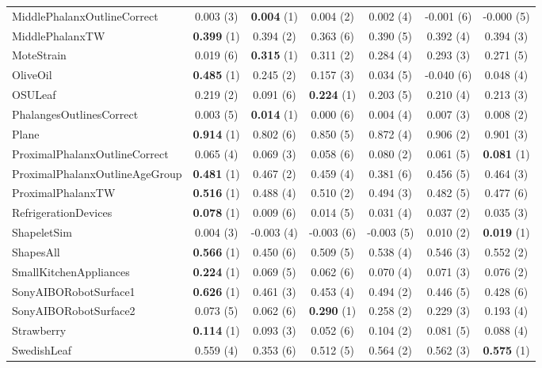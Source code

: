 \begin{table}[ht]
\begin{adjustbox}{width=\textwidth}
\begin{tabular}{lcccccc}
    MiddlePhalanxOutlineCorrect & 0.003 (3) & \textbf{0.004} (1) & 0.004 (2) & 0.002 (4) & -0.001 (6) & -0.000 (5) \\
    MiddlePhalanxTW & \textbf{0.399} (1) & 0.394 (2) & 0.363 (6) & 0.390 (5) & 0.392 (4) & 0.394 (3) \\
    MoteStrain & 0.019 (6) & \textbf{0.315} (1) & 0.311 (2) & 0.284 (4) & 0.293 (3) & 0.271 (5) \\
    OliveOil & \textbf{0.485} (1) & 0.245 (2) & 0.157 (3) & 0.034 (5) & -0.040 (6) & 0.048 (4) \\
    OSULeaf & 0.219 (2) & 0.091 (6) & \textbf{0.224} (1) & 0.203 (5) & 0.210 (4) & 0.213 (3) \\
    PhalangesOutlinesCorrect & 0.003 (5) & \textbf{0.014} (1) & 0.000 (6) & 0.004 (4) & 0.007 (3) & 0.008 (2) \\
    Plane & \textbf{0.914} (1) & 0.802 (6) & 0.850 (5) & 0.872 (4) & 0.906 (2) & 0.901 (3) \\
    ProximalPhalanxOutlineCorrect & 0.065 (4) & 0.069 (3) & 0.058 (6) & 0.080 (2) & 0.061 (5) & \textbf{0.081} (1) \\
    ProximalPhalanxOutlineAgeGroup & \textbf{0.481} (1) & 0.467 (2) & 0.459 (4) & 0.381 (6) & 0.456 (5) & 0.464 (3) \\
    ProximalPhalanxTW & \textbf{0.516} (1) & 0.488 (4) & 0.510 (2) & 0.494 (3) & 0.482 (5) & 0.477 (6) \\
    RefrigerationDevices & \textbf{0.078} (1) & 0.009 (6) & 0.014 (5) & 0.031 (4) & 0.037 (2) & 0.035 (3) \\
    ShapeletSim & 0.004 (3) & -0.003 (4) & -0.003 (6) & -0.003 (5) & 0.010 (2) & \textbf{0.019} (1) \\
    ShapesAll & \textbf{0.566} (1) & 0.450 (6) & 0.509 (5) & 0.538 (4) & 0.546 (3) & 0.552 (2) \\
    SmallKitchenAppliances & \textbf{0.224} (1) & 0.069 (5) & 0.062 (6) & 0.070 (4) & 0.071 (3) & 0.076 (2) \\
    SonyAIBORobotSurface1 & \textbf{0.626} (1) & 0.461 (3) & 0.453 (4) & 0.494 (2) & 0.446 (5) & 0.428 (6) \\
    SonyAIBORobotSurface2 & 0.073 (5) & 0.062 (6) & \textbf{0.290} (1) & 0.258 (2) & 0.229 (3) & 0.193 (4) \\
    Strawberry & \textbf{0.114} (1) & 0.093 (3) & 0.052 (6) & 0.104 (2) & 0.081 (5) & 0.088 (4) \\
    SwedishLeaf & 0.559 (4) & 0.353 (6) & 0.512 (5) & 0.564 (2) & 0.562 (3) & \textbf{0.575} (1) \\

\end{tabular}
\end{adjustbox}
\end{table}
